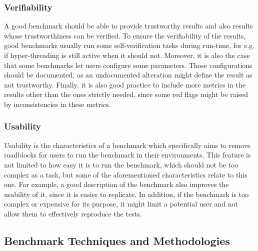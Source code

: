 \subsubsection{Verifiability}
A good benchmark should be able to provide trustworthy results and also results whose trustworthiness can be verified. To ensure the verifiability of the results, good benchmarks usually run some self-verification tasks during run-time, for e.g. if hyper-threading is still active when it should not. Moreover, it is also the case that some benchmarks let users configure some parameters. Those configurations should be documented, as an undocumented alteration might define the result as not trustworthy. \cite{how_to_bench}
Finally, it is also good practice to include more metrics in the results other than the ones strictly needed, since some red flags might be raised by inconsistencies in these metrics. 
\subsubsection{Usability}
Usability is the characteristics of a benchmark which specifically aims to remove roadblocks for users to run the benchmark in their environments. This feature is not limited to how easy it is to run the benchmark, which should not be too complex as a task, but some of the aforementioned characteristics relate to this one. For example, a good description of the benchmark also improves the usability of it, since it is easier to replicate. In addition, if the benchmark is too complex or expensive for its purpose, it might limit a potential user and not allow them to effectively reproduce the tests.



\subsection{Benchmark Techniques and Methodologies}\label{BTaM}

